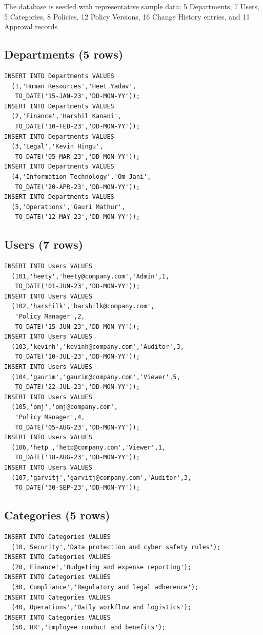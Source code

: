 \documentclass[conference]{IEEEtran}
\begin{document}
The database is seeded with representative sample data: 5 Departments, 7 Users, 5 Categories, 8 Policies, 12 Policy Versions, 16 Change History entries, and 11 Approval records.

\subsection{Departments (5 rows)}
\begin{lstlisting}[style=sqlstyle, caption={DML: INSERT INTO Departments}]
INSERT INTO Departments VALUES
  (1,'Human Resources','Heet Yadav',
   TO_DATE('15-JAN-23','DD-MON-YY'));
INSERT INTO Departments VALUES
  (2,'Finance','Harshil Kanani',
   TO_DATE('10-FEB-23','DD-MON-YY'));
INSERT INTO Departments VALUES
  (3,'Legal','Kevin Hingu',
   TO_DATE('05-MAR-23','DD-MON-YY'));
INSERT INTO Departments VALUES
  (4,'Information Technology','Om Jani',
   TO_DATE('20-APR-23','DD-MON-YY'));
INSERT INTO Departments VALUES
  (5,'Operations','Gauri Mathur',
   TO_DATE('12-MAY-23','DD-MON-YY'));
\end{lstlisting}

\subsection{Users (7 rows)}
\begin{lstlisting}[style=sqlstyle, caption={DML: INSERT INTO Users}]
INSERT INTO Users VALUES
  (101,'heety','heety@company.com','Admin',1,
   TO_DATE('01-JUN-23','DD-MON-YY'));
INSERT INTO Users VALUES
  (102,'harshilk','harshilk@company.com',
   'Policy Manager',2,
   TO_DATE('15-JUN-23','DD-MON-YY'));
INSERT INTO Users VALUES
  (103,'kevinh','kevinh@company.com','Auditor',3,
   TO_DATE('10-JUL-23','DD-MON-YY'));
INSERT INTO Users VALUES
  (104,'gaurim','gaurim@company.com','Viewer',5,
   TO_DATE('22-JUL-23','DD-MON-YY'));
INSERT INTO Users VALUES
  (105,'omj','omj@company.com',
   'Policy Manager',4,
   TO_DATE('05-AUG-23','DD-MON-YY'));
INSERT INTO Users VALUES
  (106,'hetp','hetp@company.com','Viewer',1,
   TO_DATE('18-AUG-23','DD-MON-YY'));
INSERT INTO Users VALUES
  (107,'garvitj','garvitj@company.com','Auditor',3,
   TO_DATE('30-SEP-23','DD-MON-YY'));
\end{lstlisting}

\subsection{Categories (5 rows)}
\begin{lstlisting}[style=sqlstyle, caption={DML: INSERT INTO Categories}]
INSERT INTO Categories VALUES
  (10,'Security','Data protection and cyber safety rules');
INSERT INTO Categories VALUES
  (20,'Finance','Budgeting and expense reporting');
INSERT INTO Categories VALUES
  (30,'Compliance','Regulatory and legal adherence');
INSERT INTO Categories VALUES
  (40,'Operations','Daily workflow and logistics');
INSERT INTO Categories VALUES
  (50,'HR','Employee conduct and benefits');
\end{lstlisting}
\end{document}
